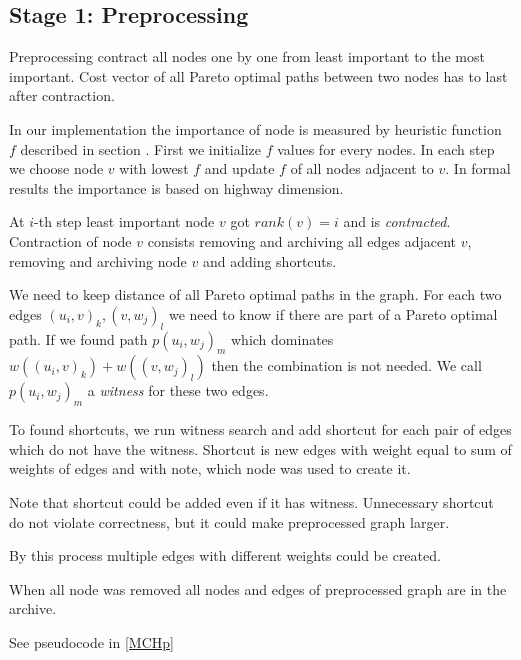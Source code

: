 

\subsection{Stage 1: Preprocessing}
\label{subsecStage1}

Preprocessing contract all nodes one by one from least important to the most important. 
Cost vector of all Pareto optimal paths between two nodes has to last after contraction.

In our implementation the importance of node is measured by heuristic function $f$
described in section . 
First we initialize $f$ values for every nodes. In each step we choose node $v$ with 
lowest $f$ and update $f$ of all nodes adjacent to $v$.
In formal results the importance is based on highway dimension.

At $i$-th step least important node $v$ got $rank(v) = i$ and is \emph{contracted}. 
Contraction of node $v$ consists removing and archiving all edges adjacent $v$, removing 
and archiving node $v$ and adding shortcuts. 

We need to keep distance of all Pareto optimal paths in the graph. 
For each two edges $(u_i,v)_k,(v,w_j)_l$ we need to know if there
are part of a Pareto optimal path. If we found path $p(u_i,w_j)_m$ which dominates
$w((u_i,v)_k)+w((v,w_j)_l)$ then the combination is not needed. 
We call $p(u_i,w_j)_m$ a \emph{witness} for these two edges. 

To found shortcuts, we run witness search and add shortcut for each pair of edges
which do not have the witness. Shortcut is new edges with weight equal to sum
of weights of edges and with note, which node was used to create it.

Note that shortcut could be added even if it has witness. 
Unnecessary shortcut do not violate correctness, but it could make preprocessed graph larger.

By this process multiple edges with different weights could be created. 

When all node was removed all nodes and edges of preprocessed graph are in the archive.

See pseudocode in \ref{MCHp}

